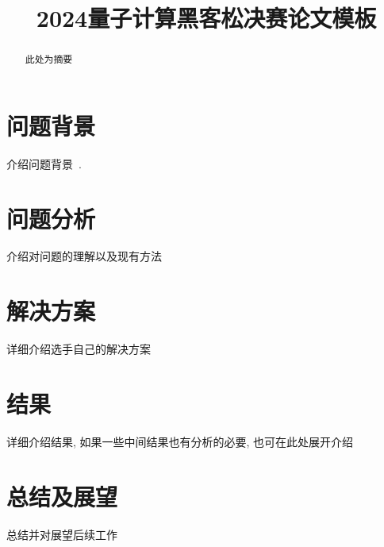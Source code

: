 \documentclass[withoutpreface,bwprint]{cumcmthesis}
\title{2024量子计算黑客松决赛论文模板}  %
\begin{document}
\maketitle
\begin{abstract}
此处为摘要


\end{abstract}


\section{问题背景}
介绍问题背景~\cite{nielsen2001quantum}.


\section{问题分析}
介绍对问题的理解以及现有方法




\section{解决方案}
详细介绍选手自己的解决方案

\section{结果}
详细介绍结果, 如果一些中间结果也有分析的必要, 也可在此处展开介绍


\section{总结及展望}
总结并对展望后续工作


\nocite{*}
\end{document}
